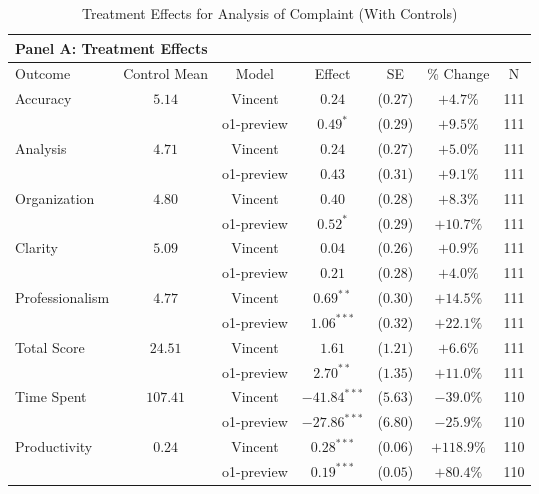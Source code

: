 \begin{table}[!htbp]
\centering
\caption{Treatment Effects for Analysis of Complaint (With Controls)}
\label{tab:task3_effects_controls}
\vspace{0.3cm}
\begin{tabular}{lcccccc}
\multicolumn{7}{l}{\textbf{Panel A: Treatment Effects}} \\
\hline\hline
Outcome & Control Mean & Model & Effect & SE & \% Change & N \\
\hline
\multirow{2}{*}{Accuracy} & \multirow{2}{*}{$5.14$} & Vincent & $0.24$ & ($0.27$) & $+4.7\%$ & 111 \\
& & o1-preview & $0.49^{*}$ & ($0.29$) & $+9.5\%$ & 111 \\
\hline
\multirow{2}{*}{Analysis} & \multirow{2}{*}{$4.71$} & Vincent & $0.24$ & ($0.27$) & $+5.0\%$ & 111 \\
& & o1-preview & $0.43$ & ($0.31$) & $+9.1\%$ & 111 \\
\hline
\multirow{2}{*}{Organization} & \multirow{2}{*}{$4.80$} & Vincent & $0.40$ & ($0.28$) & $+8.3\%$ & 111 \\
& & o1-preview & $0.52^{*}$ & ($0.29$) & $+10.7\%$ & 111 \\
\hline
\multirow{2}{*}{Clarity} & \multirow{2}{*}{$5.09$} & Vincent & $0.04$ & ($0.26$) & $+0.9\%$ & 111 \\
& & o1-preview & $0.21$ & ($0.28$) & $+4.0\%$ & 111 \\
\hline
\multirow{2}{*}{Professionalism} & \multirow{2}{*}{$4.77$} & Vincent & $0.69^{**}$ & ($0.30$) & $+14.5\%$ & 111 \\
& & o1-preview & $1.06^{***}$ & ($0.32$) & $+22.1\%$ & 111 \\
\hline
\multirow{2}{*}{Total Score} & \multirow{2}{*}{$24.51$} & Vincent & $1.61$ & ($1.21$) & $+6.6\%$ & 111 \\
& & o1-preview & $2.70^{**}$ & ($1.35$) & $+11.0\%$ & 111 \\
\hline
\multirow{2}{*}{Time Spent} & \multirow{2}{*}{$107.41$} & Vincent & $-41.84^{***}$ & ($5.63$) & $-39.0\%$ & 110 \\
& & o1-preview & $-27.86^{***}$ & ($6.80$) & $-25.9\%$ & 110 \\
\hline
\multirow{2}{*}{Productivity} & \multirow{2}{*}{$0.24$} & Vincent & $0.28^{***}$ & ($0.06$) & $+118.9\%$ & 110 \\
& & o1-preview & $0.19^{***}$ & ($0.05$) & $+80.4\%$ & 110 \\
\hline
\end{tabular}


\end{table}
